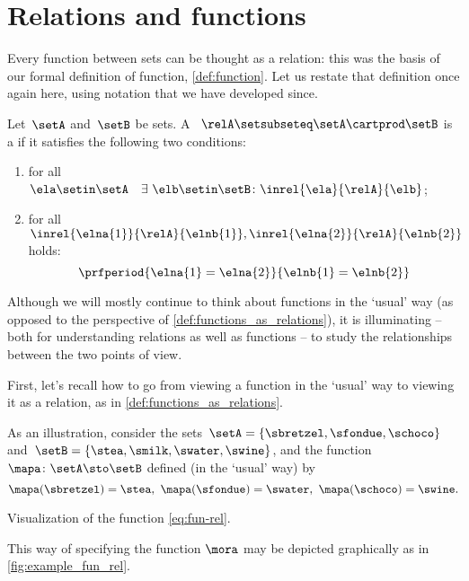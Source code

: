 
\section{Relations and functions}

Every function between sets can be thought as a relation: this was the basis of our formal definition of function, \cref{def:function}.
Let us restate that definition once again here, using notation that we have developed since.

\begin{definition}
    \label{def:functions_as_relations}
    Let~$\setA$ and~$\setB$ be sets.
    A ~$\relA \setsubseteq \setA \cartprod \setB$ is a \emph{} if it satisfies the following two conditions:
    \begin{enumerate}
        \item for all~$\ela \setin \setA \quad \exists \ \elb \setin \setB\colon  \inrel{\ela}{\relA}{\elb}$;
        \item for all~$\inrel{\elna{1}}{\relA}{\elnb{1}}, \inrel{\elna{2}}{\relA}{\elnb{2}}$ holds:
              \begin{equation*}
                  \prfperiod{\elna{1} = \elna{2}}{\elnb{1} = \elnb{2}}
              \end{equation*}
    \end{enumerate}
\end{definition}

Although we will mostly continue to think about functions in the `usual' way (as opposed to the perspective of \cref{def:functions_as_relations}), it is illuminating -- both for understanding relations as well as functions -- to study the relationships between the two points of view.

First, let's recall how to go from viewing a function in the `usual' way to viewing it as a relation, as in \cref{def:functions_as_relations}.

As an illustration, consider the sets~$\setA = \{ \sbretzel, \sfondue, \schoco \}$ and~$\setB = \{ \stea, \smilk, \swater, \swine \}$, and the function~$\mapa \colon \setA \sto \setB$ defined (in the `usual' way) by
\begin{equation*}
    \mapa (\sbretzel) = \stea, \ \mapa (\sfondue) = \swater, \ \mapa(\schoco) = \swine.
\end{equation*}
\begin{marginfigure}
    \centering
    \caption{Visualization of the function \cref{eq:fun-rel}.}
    \label{fig:example_fun_rel}
\end{marginfigure}
This way of specifying the function $\mora$ may be depicted graphically as in \cref{fig:example_fun_rel}.

